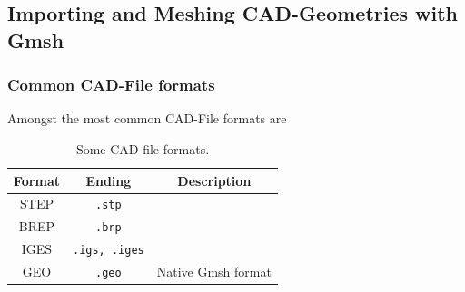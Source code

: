 %
%
%
%
%


\subsection{Importing and Meshing CAD-Geometries with Gmsh}

\begin{frame}
  \frametitle{Common CAD-File formats}
  \begin{table}
    Amongst the most common CAD-File formats are
    \begin{center}
      \begin{tabular}{|c|c|c|}
        \hline
        Format & Ending & Description
        \\
        \hline
        STEP & \lstinline!.stp! &
        \\
        \hline
        BREP & \lstinline!.brp! &
        \\
        \hline
        IGES & \lstinline!.igs, .iges! &
        \\
        \hline
        GEO & \lstinline!.geo! & Native Gmsh format
        \\
        \hline
      \end{tabular}
      \caption{Some CAD file formats.}
      \label{tab:CADFileFormats}
    \end{center}
  \end{table}
\end{frame}

